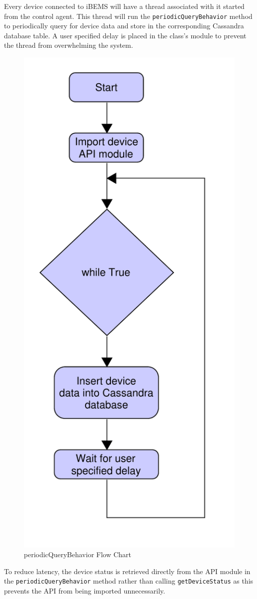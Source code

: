 Every device connected to iBEMS will have a thread associated with it started from the control agent. This thread will run the \texttt{periodicQueryBehavior} method to periodically query for device data and store in the corresponding Cassandra database table. A user specified delay is placed in the class's module to prevent the thread from overwhelming the system.
\begin{figure}[H]
    \centering
    \includegraphics[scale=0.5]{figs/agents/periodicQueryBehavior.pdf}
    \caption{periodicQueryBehavior Flow Chart}
    \label{fig:periodicQueryBehavior}
\end{figure}
To reduce latency, the device status is retrieved directly from the API module in the \texttt{periodicQueryBehavior} method rather than calling \texttt{getDeviceStatus} as this prevents the API from being imported unnecessarily.

